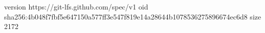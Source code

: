 version https://git-lfs.github.com/spec/v1
oid sha256:4b048f7fbf5e647150a577ff3e547f819e14a28644b1078536275896674ec6d8
size 2172
